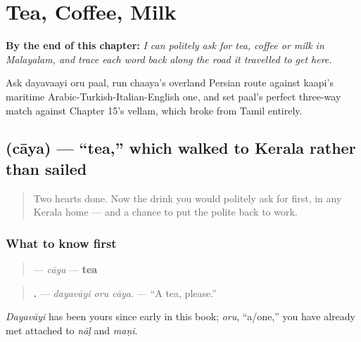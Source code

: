 
\chapter{Tea, Coffee, Milk}
\label{ch:ml-tea-coffee-milk}

\begin{chapteropening}
\textbf{By the end of this chapter:} \emph{I can politely ask for tea, coffee or milk in Malayalam, and trace each word back along the road it travelled to get here.}

Ask dayavaayi oru paal, run chaaya's overland Persian route against kaapi's maritime Arabic-Turkish-Italian-English one, and set paal's perfect three-way match against Chapter 15's vellam, which broke from Tamil entirely.
\end{chapteropening}

\section[\texorpdfstring{\ml{ചായ} (cāya)}{ചായ (cāya)}]{ (cāya) — \textquotedblleft{}tea,\textquotedblright{} which walked to Kerala rather than sailed}

\label{lesson:ML-C39-chaaya}



\begin{quote}
Two hearts done. Now the drink you would politely ask for first, in any Kerala home — and a chance to put the polite \textbf{} back to work.
\end{quote}

\subsection*{What to know first}
\begin{quote}
\textbf{} — \emph{cāya} — \textbf{tea}
\end{quote}

\begin{quote}
\textbf{  .} — \emph{dayavāyi oru cāya.} — \textquotedblleft{}A tea, please.\textquotedblright{}
\end{quote}

\emph{Dayavāyi} has been yours since early in this book; \emph{oru}, \textquotedblleft{}a/one,\textquotedblright{} you have already met attached to \emph{nāḷ} and \emph{maṇi}.

